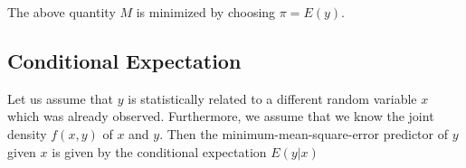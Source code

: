 \documentclass[]{tufte-handout}
\begin{document}
The above quantity \(M\) is minimized by choosing \(\pi = E(y)\).

\hypertarget{conditional-expectation}{%
\subsection{Conditional Expectation}\label{conditional-expectation}}

Let us assume that \(y\) is statistically related to a different random variable \(x\) which was already observed. Furthermore, we assume that we know the joint density \(f(x, y)\) of \(x\) and \(y\). Then the minimum-mean-square-error predictor of \(y\) given \(x\) is given by the conditional expectation \(E(y|x)\)
\end{document}
